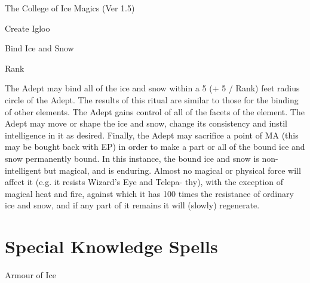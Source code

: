 \begin{Chapter}{The College of Ice Magics (Ver 1.5)}
\begin{ritual}[Q-1]{Create Igloo }
\begin{effects}
\end{effects}
\end{ritual}

\begin{ritual}[Q-2]{Bind Ice and Snow }

Rank 
\begin{effects}
 The  Adept  may  bind  all  of  the  ice  and 
snow  within  a  5  (+  5  /  Rank)  feet  radius  circle  of 
the  Adept.  The  results  of  this  ritual  are  similar  to 
those for the binding of other elements. The Adept 
gains  control  of  all  of  the  facets  of  the  element. 
The  Adept  may  move  or  shape  the  ice  and  snow, 
change  its  consistency  and  instil  intelligence  in  it 
as desired. Finally, the Adept may sacrifice a point 
of MA (this may be bought back with EP) in order 
to  make  a  part  or  all  of  the  bound  ice  and  snow 
permanently bound. In this instance, the bound ice 
and  snow  is  non-intelligent  but  magical,  and  is 
enduring. Almost no magical or physical force will 
affect  it  (e.g.  it  resists  Wizard’s  Eye  and  Telepa-
thy),  with  the  exception  of  magical  heat  and  fire, 
against  which  it  has  100  times  the  resistance  of 
ordinary ice and snow, and if any part of it remains 
it will (slowly) regenerate. 






\end{effects}
\end{ritual}

\section{Special Knowledge Spells}

\begin{spell}[S-1]{Armour of Ice }


\end{spell}
\end{Chapter}
